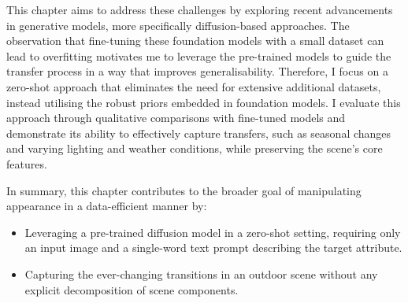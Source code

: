 This chapter aims to address these challenges by exploring recent advancements in generative models, more specifically diffusion-based approaches. The observation that fine-tuning these foundation models with a small dataset can lead to overfitting motivates me to leverage the pre-trained models to guide the transfer process in a way that improves generalisability. Therefore, I focus on a zero-shot approach that eliminates the need for extensive additional datasets, instead utilising the robust priors embedded in foundation models. I evaluate this approach through qualitative comparisons with fine-tuned models and demonstrate its ability to effectively capture transfers, such as seasonal changes and varying lighting and weather conditions, while preserving the scene's core features.


In summary, this chapter contributes to the broader goal of manipulating appearance in a data-efficient manner by:

\begin{itemize}

   \item Leveraging a pre-trained diffusion model in a zero-shot setting, requiring only an input image and a single-word text prompt describing the target attribute.
    
   \item Capturing the ever-changing transitions in an outdoor scene without any explicit decomposition of scene components.

\end{itemize}
